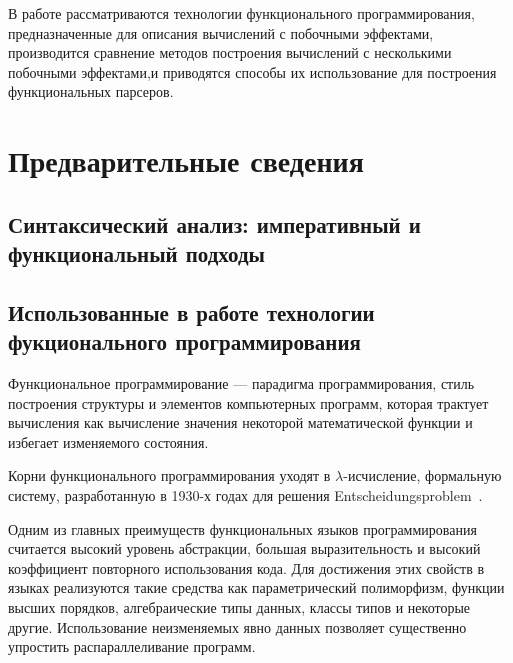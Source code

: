 



\usepackage{float}



\Intro
В работе рассматриваются технологии функционального программирования, предназначенные для описания вычислений с побочными эффектами, производится сравнение методов построения вычислений с несколькими побочными эффектами,и приводятся способы их использование для построения функциональных парсеров.   

\section{Предварительные сведения}

\subsection{Синтаксический анализ: императивный и функциональный подходы}

\subsection{Использованные в работе технологии фукционального программирования}

Функциональное программирование --- парадигма программирования, стиль построения структуры и элементов компьютерных программ, которая трактует вычисления как вычисление значения некоторой математической функции и избегает изменяемого состояния.

Корни функционального программирования уходят в $\lambda$-исчисление, формальную систему, разработанную в 1930-х годах для решения Entscheidungsproblem~\autocite{Entscheidungsproblem}.

Одним из главных преимуществ функциональных языков программирования считается высокий уровень абстракции, большая выразительность и высокий коэффициент повторного использования кода. Для достижения этих свойств в языках реализуются такие средства как параметрический полиморфизм, функции высших порядков, алгебраические типы данных, классы типов и некоторые другие. Использование неизменяемых явно данных позволяет существенно упростить распараллеливание программ. 

